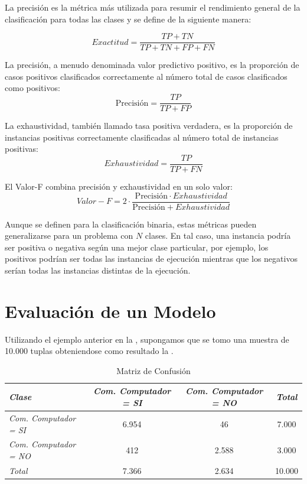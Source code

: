 La precisión es la métrica más utilizada para resumir el rendimiento general de la clasificación para todas las clases y se define de la siguiente manera:

\begin{equation}
Exactitud = \frac{TP + TN}{TP + TN + FP + FN}\label{eq3:exactitud}
\end{equation}

La precisión, a menudo denominada valor predictivo positivo, es la proporción de casos positivos clasificados correctamente al número total de casos clasificados como positivos:
\begin{equation}
\mbox{Precisión} = \frac{TP}{TP + FP}\label{eq3:precision}
\end{equation}

La exhaustividad, también llamado tasa positiva verdadera, es la proporción de instancias positivas correctamente clasificadas al número total de instancias positivas:
\begin{equation}
Exhaustividad = \frac{TP}{TP + FN}\label{eq3:exaustividad}
\end{equation}


El Valor-F combina precisión y exhaustividad en un solo valor:
\begin{equation}
Valor-F = 2 \cdot \frac{\mbox{Precisión} \cdot Exhaustividad}{\mbox{Precisión} + Exhaustividad}\label{eq3:valorf}
\end{equation}

Aunque se definen para la clasificación binaria, estas métricas pueden generalizarse para un problema con $N$ clases. En tal caso, una instancia podría ser positiva o negativa según una mejor clase particular, por ejemplo, los positivos podrían ser todas las instancias de ejecución mientras que los negativos serían todas las instancias distintas de la ejecución.

\section{Evaluación de un Modelo}

Utilizando el ejemplo anterior en la , supongamos que se tomo una muestra de 10.000 tuplas obteniendose como resultado la .


\begin{table}[!htbp]
	\begin{tabular}{|l|c|c|c|}
		\hline 
		\textit{Clase} & \textit{Com. Computador = SI}    &\textit{Com. Computador = NO} & \textit{Total}  \\
		\hline 
		\textit{Com. Computador = SI}	& 6.954   	& 46    	& 7.000     \\ 
		\hline 
		\textit{Com. Computador = NO}	& 412		& 2.588		& 3.000    	\\ 
		\hline
		\textit{Total}					& 7.366		& 2.634    	& 10.000	\\ 
		\hline
	\end{tabular}
    \caption{\label{tabla:MatrizConfusion}Matriz de Confusión}
\end{table}


